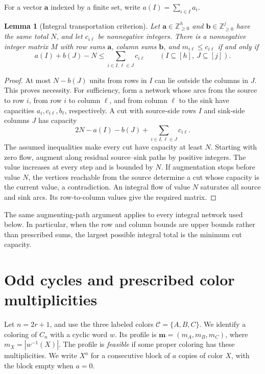 \documentclass[11pt,reqno]{amsart}
\numberwithin{equation}{section}
\newtheorem{lemma}[theorem]{Lemma}
\theoremstyle{definition}
\theoremstyle{remark}
\begin{document}
For a vector $\mathbf a$ indexed by a finite set, write
$a(I)=\sum_{i\in I}a_i$.
\begin{lemma}[Integral transportation criterion]\label{lem:transport}
Let $\mathbf a\in\mathbb Z_{\ge0}^{h}$ and
$\mathbf b\in\mathbb Z_{\ge0}^{j}$ have the same total $N$, and let
$c_{i\ell}$ be nonnegative integers. There is a nonnegative integer
matrix $M$ with row sums $\mathbf a$, column sums $\mathbf b$, and
$m_{i\ell}\le c_{i\ell}$ if and only if
\begin{equation}\label{eq:transport-cut}
 a(I)+b(J)-N\le\sum_{i\in I,\ell\in J}c_{i\ell}
 \qquad(I\subseteq[h],\ J\subseteq[j]).
\end{equation}
\end{lemma}
\begin{proof}
At most $N-b(J)$ units from rows in $I$ can lie outside the columns in
$J$. This proves necessity. For sufficiency, form a network whose arcs
from the source to row $i$, from row $i$ to column $\ell$, and from column
$\ell$ to the sink have capacities $a_i,c_{i\ell},b_\ell$, respectively.
A cut with source-side rows $I$ and sink-side columns $J$ has capacity
\[
 2N-a(I)-b(J)+\sum_{i\in I,\ell\in J}c_{i\ell}.
\]
The assumed inequalities make every cut have capacity at least $N$.
Starting with zero flow, augment along residual source--sink paths by
positive integers. The value increases at every step and is bounded by
$N$. If augmentation stops before value $N$, the vertices reachable from
the source determine a cut whose capacity is the current value, a
contradiction. An integral flow of value $N$ saturates all source and sink
arcs. Its row-to-column values give the required matrix.
\end{proof}

The same augmenting-path argument applies to every integral network used
below. In particular, when the row and column bounds are upper bounds
rather than prescribed sums, the largest possible integral total is the
minimum cut capacity.

\section{Odd cycles and prescribed color multiplicities}\label{sec:oddcycles}

Let $n=2r+1$, and use the three labeled colors
$\mathcal C=\{A,B,C\}$. We identify a coloring of $C_n$ with a
cyclic word $w$. Its profile is
$\mathbf m=(m_A,m_B,m_C)$, where
$m_X=|w^{-1}(X)|$. The profile is \emph{feasible} if some proper
coloring has these multiplicities.
We write $X^a$ for a consecutive block of $a$ copies of color $X$,
with the block empty when $a=0$.
\end{document}
